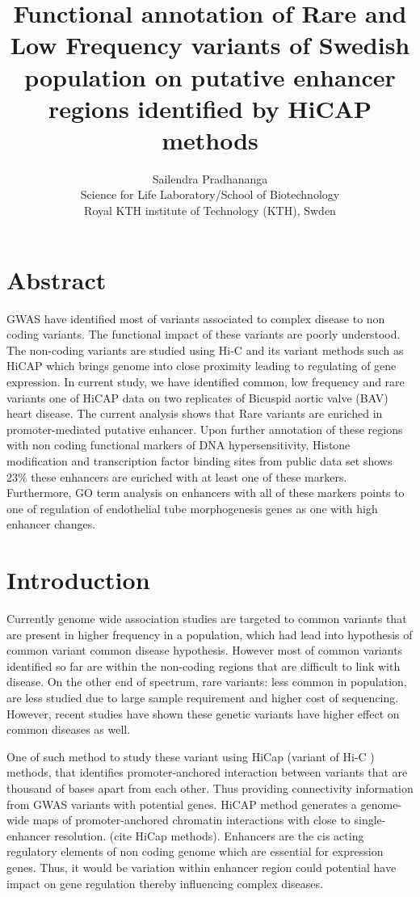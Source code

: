 \documentclass[11pt]{article} %
\title{Functional annotation of Rare and Low Frequency variants of Swedish population on putative enhancer regions identified by HiCAP methods}
\author{Sailendra Pradhananga\\
Science for Life Laboratory/School of Biotechnology\\
Royal KTH institute of Technology (KTH), Swden}
\date{} %
\begin{document}
\maketitle


\section*{Abstract}

GWAS have identified most of variants associated to complex disease to non coding variants. The functional impact of these variants are poorly understood. The non-coding variants are studied using Hi-C and its variant methods such as HiCAP which brings genome into close proximity leading to regulating of gene expression. In current study, we have identified common, low frequency and rare variants one of HiCAP data on two replicates of Bicuspid aortic valve (BAV) heart disease. The current analysis shows that Rare variants are enriched in promoter-mediated putative enhancer. Upon further annotation of these regions with non coding functional markers of DNA hypersensitivity, Histone modification and transcription factor binding sites from public data set shows  $23\%$ these enhancers are enriched with at least one of these markers.  Furthermore, GO term analysis on enhancers with all of these markers points to one of regulation of endothelial tube morphogenesis genes as one with high enhancer changes.

\section{Introduction}
Currently genome wide association studies are targeted to common variants that are present in higher frequency in a population, which had lead into hypothesis of common variant common disease hypothesis. However most of common variants identified so far are within the non-coding regions that are difficult to link with disease. On the other end of spectrum, rare variants: less common in population, are less studied due to large sample requirement and higher cost of sequencing. However, recent studies have shown these genetic variants have higher effect on common diseases as well. 

One of such method to study these variant using HiCap (variant of Hi-C ) methods, that identifies promoter-anchored interaction between variants that are thousand of bases apart from each other. Thus providing connectivity information from GWAS variants with potential genes. HiCAP method generates a genome-wide maps of promoter-anchored chromatin interactions with close to single-enhancer resolution. (cite HiCap methods).  Enhancers are the cis acting regulatory elements of non coding genome which are essential for expression genes. Thus, it would be variation within enhancer region could potential have impact on gene regulation thereby influencing complex diseases.
\end{document}
